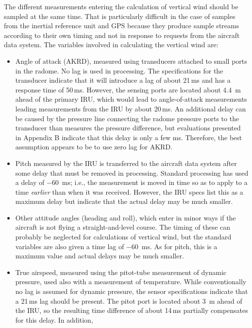 \documentclass[12pt,twoside,english]{article}\usepackage[]{graphicx}\usepackage[]{color}
\let\OrgIndex\index
\renewcommand*{\index}[1]{\OrgIndex{#1}}
\begin{document}
The different measurements entering the calculation of vertical wind should be sampled at the same time. That is particularly difficult in the case of samples from the inertial reference unit and GPS because they produce sample streams according to their own timing and not in response to requests from the aircraft data system. The variables involved in calculating the vertical wind are:  
\begin{itemize}
\item Angle of attack (AKRD), measured using transducers attached to small ports in the radome. No lag is used in processing. The specifications for the transducer indicate that it will introduce a lag of about 21\,ms and has a response time of 50\,ms. However, the sensing ports are located about 4.4~m ahead of the primary IRU, which would lead to angle-of-attack measurements leading measurements from the IRU by about 20\,ms. 
An additional delay can be caused by the pressure line connecting the radome pressure ports to the transducer than measures the pressure difference, but
evaluations presented in Appendix B indicate that this delay is only a few ms. Therefore, the best assumption appears to be to use zero lag for AKRD.
\item Pitch measured by the IRU is transferred to the aircraft data system after some delay that must be removed in processing. Standard processing has used a delay of $-60$~ms; i.e., the measurement is moved in time so as to apply to a time \emph{earlier} than when it was received. However, the IRU specs list this as a maximum delay but indicate that the actual delay may be much smaller.
\item Other attitude angles (heading and roll), which enter in minor ways if the aircraft is not flying a straight-and-level course. The timing of these can probably be neglected for calculations of vertical wind, but the standard variables are also given a time lag of $-60$~ms. As for pitch, this is a maximum value and actual delays may be much smaller.
\item True airspeed, measured using the pitot-tube measurement of dynamic pressure, used also with a measurement of temperature. While conventionally no lag is assumed for dynamic pressure, the sensor specifications indicate that a 21\,ms lag should be present. The pitot port is located about 3~m ahead of the IRU, so the resulting time difference of about 14\,ms partially compensates for this delay. In addition,

\end{itemize}
\end{document}
